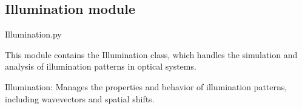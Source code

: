 \documentclass[letterpaper,10pt,english]{sphinxmanual}
\begin{document}
\sphinxstepscope


\subsection{Illumination module}
\label{\detokenize{source/Illumination:module-Illumination}}\label{\detokenize{source/Illumination:illumination-module}}\label{\detokenize{source/Illumination::doc}}
\sphinxAtStartPar
Illumination.py

\sphinxAtStartPar
This module contains the Illumination class, which handles the simulation and analysis of illumination patterns in optical systems.
\begin{description}
\sphinxAtStartPar
Illumination: Manages the properties and behavior of illumination patterns, including wavevectors and spatial shifts.

\end{description}

\end{document}
